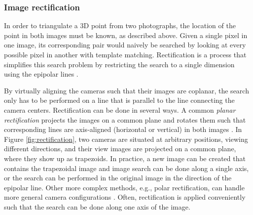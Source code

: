 

\subsubsection{Image rectification} %


In order to triangulate a 3D point from two photographs, the location of the point in both images must be known, as described above.
Given a single pixel in one image, its corresponding pair would naively be searched by looking at every possible pixel in another with template matching.
Rectification is a process that simplifies this search problem by restricting the search to a single dimension using the epipolar lines \cite[p. 157]{trucco1998introductory} \cite[ch. 7.1]{pollefeys2004visual}.

By virtually aligning the cameras such that their images are coplanar, the search only has to be performed on a line that is parallel to the line connecting the camera centers.
Rectification can be done in several ways.
A common \emph{planar rectification} projects the images on a common plane and rotates them such that corresponding lines are axis-aligned (horizontal or vertical) in both images \cite{hartley03multiview}.
In Figure \ref{fig:rectification}, two cameras are situated at arbitrary positions, viewing different directions, and their view images are projected on a common plane, where they show up as trapezoids.
In practice, a new image can be created that contains the trapezoidal image and image search can be done along a single axis, or the search can be performed in the original image in the direction of the epipolar line.
Other more complex methods, e.g., polar rectification, can handle more general camera configurations \cite{pollefeys2004visual}.
Often, rectification is applied conveniently such that the search can be done along one axis of the image.



